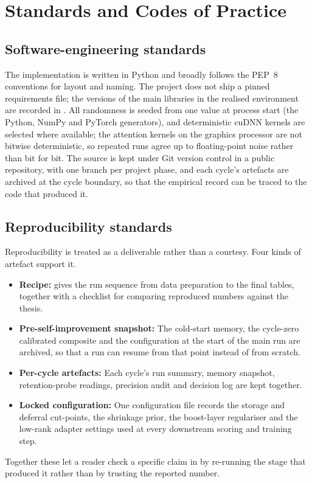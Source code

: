 \section{Standards and Codes of Practice}
\label{sec:standards}

\subsection{Software-engineering standards}
\label{sec:std-software}

The implementation is written in Python and broadly follows the PEP~8 conventions for layout and naming. The project does not ship a pinned requirements file; the versions of the main libraries in the realised environment are recorded in . All randomness is seeded from one value at process start (the Python, NumPy and PyTorch generators), and deterministic cuDNN kernels are selected where available; the attention kernels on the graphics processor are not bitwise deterministic, so repeated runs agree up to floating-point noise rather than bit for bit. The source is kept under Git version control in a public repository, with one branch per project phase, and each cycle's artefacts are archived at the cycle boundary, so that the empirical record can be traced to the code that produced it.

\subsection{Reproducibility standards}
\label{sec:std-reproducibility}

Reproducibility is treated as a deliverable rather than a courtesy. Four kinds of artefact support it.
\begin{itemize}
    \item \textbf{Recipe:}  gives the run sequence from data preparation to the final tables, together with a checklist for comparing reproduced numbers against the thesis.
    \item \textbf{Pre-self-improvement snapshot:} The cold-start memory, the cycle-zero calibrated composite and the configuration at the start of the main run are archived, so that a run can resume from that point instead of from scratch.
    \item \textbf{Per-cycle artefacts:} Each cycle's run summary, memory snapshot, retention-probe readings, precision audit and decision log are kept together.
    \item \textbf{Locked configuration:} One configuration file records the storage and deferral cut-points, the shrinkage prior, the boost-layer regulariser and the low-rank adapter settings used at every downstream scoring and training step.
\end{itemize}
Together these let a reader check a specific claim in  by re-running the stage that produced it rather than by trusting the reported number.

